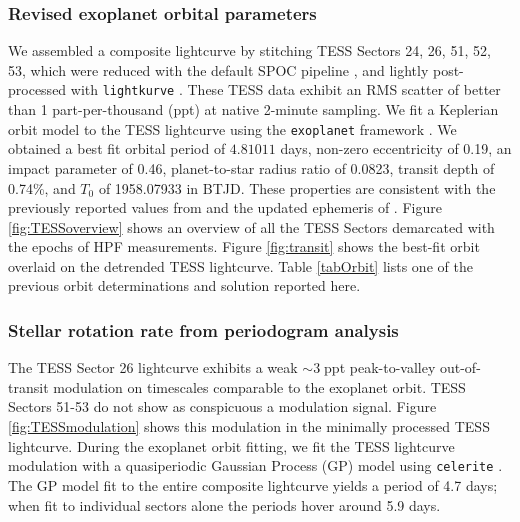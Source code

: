 \documentclass[twocolumn]{aastex631}
\begin{document}
\subsubsection{Revised exoplanet orbital parameters}
We assembled a composite lightcurve by stitching TESS Sectors 24, 26, 51, 52, 53, which were reduced with the default SPOC pipeline \citep{2020RNAAS...4..201C}, and lightly post-processed with \texttt{lightkurve} \citep{geert_barentsen_2019_2565212}.  These TESS data exhibit an RMS scatter of better than 1 part-per-thousand (ppt) at native 2-minute sampling.  We fit a Keplerian orbit model to the TESS lightcurve using the \texttt{exoplanet} framework \citep{exoplanet:joss}.  We obtained a best fit orbital period of $4.81011$ days, non-zero eccentricity of 0.19, an impact parameter of 0.46, planet-to-star radius ratio of 0.0823, transit depth of 0.74\%, and $T_0$ of 1958.07933 in BTJD.  These properties are consistent with the previously reported values from \citet{2017AJ....153..211Z} and the updated ephemeris of \citet{2022ApJS..259...62I}.  Figure \ref{fig:TESSoverview} shows an overview of all the TESS Sectors demarcated with the epochs of HPF measurements.  Figure \ref{fig:transit} shows the best-fit orbit overlaid on the detrended TESS lightcurve.  Table \ref{tabOrbit} lists one of the previous orbit determinations and solution reported here.



\subsubsection{Stellar rotation rate from periodogram analysis}

The TESS Sector 26 lightcurve exhibits a weak $\sim3\;$ppt peak-to-valley out-of-transit modulation on timescales comparable to the exoplanet orbit. TESS Sectors 51-53 do not show as conspicuous a modulation signal.  Figure \ref{fig:TESSmodulation} shows this modulation in the minimally processed TESS lightcurve.  During the exoplanet orbit fitting, we fit the TESS lightcurve modulation with a quasiperiodic Gaussian Process (GP) model using \texttt{celerite} \citep{celerite1,celerite2}.  The GP model fit to the entire composite lightcurve yields a period of 4.7 days; when fit to individual sectors alone the periods hover around 5.9 days.
\end{document}
